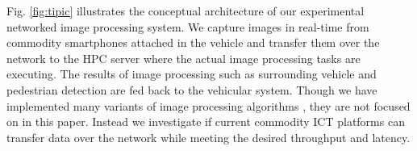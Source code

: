 Fig. \ref{fig:tipic} illustrates the conceptual architecture of our
experimental networked image processing system.
We capture images in real-time from commodity smartphones attached in
the vehicle and transfer them over the network to the HPC server where
the actual image processing tasks are executing.
The results of image processing such as surrounding vehicle and
pedestrian detection are fed back to the vehicular system.
Though we have implemented many variants of image processing algorithms
\cite{Hirabayashi13}, they are not focused on in this paper.
Instead we investigate if current commodity ICT platforms can transfer
data over the network while meeting the desired throughput and latency.

